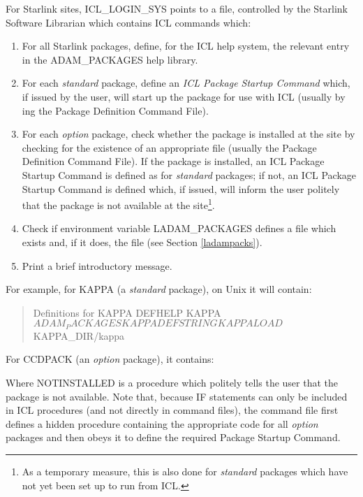 \documentclass[twoside,11pt,nolof]{starlink}
\begin{document}
For Starlink sites, ICL\_LOGIN\_SYS points to a file, controlled by the
Starlink Software Librarian which contains ICL commands which:
\begin{enumerate}
\item For all Starlink packages, define, for the ICL
help system, the relevant entry in the ADAM\-\_PACKAGES help library.
\item For each \textit{standard}\/ package, define an
\textit{ICL Package Startup Command} which, if issued by the user, will
start up the package for use with ICL (usually by
ing the Package Definition
Command File).
\item For each \textit{option}\/ package, check whether the package is installed
at the site by checking for the existence of an appropriate file (usually the
Package Definition Command File).
If the package is installed, an ICL Package Startup Command is defined as for
\textit{standard} packages; if not, an ICL Package Startup Command is defined
which, if issued, will inform the user politely that the package is not
available at the site\footnote{As a temporary measure, this is also done for
\textit{standard} packages which have not yet been set up to run from ICL.}.
\item Check if environment variable LADAM\-\_PACKAGES defines a file which
exists and, if it does,
 the file (see  Section \ref{ladampacks}).
\item Print a brief introductory message.
\end{enumerate}

For example, for KAPPA (a \textit{standard} package), on Unix it will contain:
\begin{quote}
\begin{terminalv}
{  Definitions for KAPPA }
DEFHELP KAPPA $ADAM_PACKAGES KAPPA
DEFSTRING KAPPA LOAD $KAPPA_DIR/kappa
\end{terminalv}
\end{quote}

For CCDPACK (an \textit{option} package), it contains:
\begin{quote}
\end{quote}
Where NOTINSTALLED is a procedure which politely tells the user that the
package is not available.
Note that, because IF statements can only be included in ICL procedures (and not
directly in command files), the command file first defines a hidden procedure
containing the appropriate code for all \textit{option} packages and then obeys
it to define the required Package Startup Command.
\end{document}
